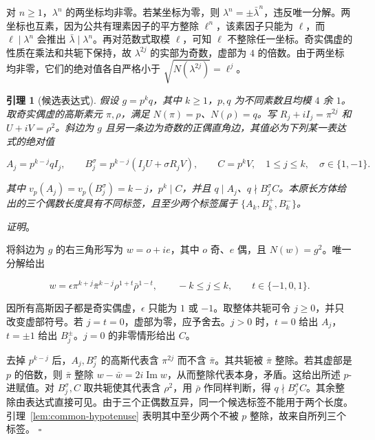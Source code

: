 \documentclass[11pt,a4paper,twoside]{article}
\numberwithin{equation}{section}
\newcommand{\proseheadingstop}{。}
\newtheorem{lemma}[theorem]{引理}
\providecommand{\proofname}{证明}
\newenvironment{proof}[1][\proofname]{%
  \par\addvspace{.65\baselineskip}\noindent
  \textit{#1}\proseheadingstop\enspace\ignorespaces
}{%
  \unskip\nobreak\hfill\nobreak\(\square\)\par
  \addvspace{.65\baselineskip}
}
\begin{document}
对 \(n\ge1\)，\(\lambda^n\) 的两坐标均非零。若某坐标为零，则 \(\lambda^n=\pm\bar\lambda^n\)，违反唯一分解。两坐标也互素，因为公共有理素因子的平方整除 \(\ell^n\)，该素因子只能为 \(\ell\)，而 \(\ell\mid\lambda^n\) 会推出 \(\bar\lambda\mid\lambda^n\)。再对范数式取模 \(\ell\)，可知 \(\ell\) 不整除任一坐标。奇实偶虚的性质在乘法和共轭下保持，故 \(\lambda^{2j}\) 的实部为奇数，虚部为 \(4\) 的倍数。由于两坐标均非零，它们的绝对值各自严格小于 \(\sqrt{N(\lambda^{2j})}=\ell^j\)。

\begin{lemma}[候选表达式]\label{lem:candidates}
假设 \(g=p^kq\)，其中 \(k\ge1\)，\(p,q\) 为不同素数且均模 \(4\) 余 \(1\)。取奇实偶虚的高斯素元 \(\pi,\rho\)，满足 \(N(\pi)=p\)、\(N(\rho)=q\)。写 \(R_j+iI_j=\pi^{2j}\) 和 \(U+iV=\rho^2\)。斜边为 \(g\) 且另一条边为奇数的正偶直角边，其值必为下列某一表达式的绝对值

\[
A_j=p^{k-j}qI_j,\qquad B_j^\sigma=p^{k-j}(I_jU+\sigma R_jV),\qquad C=p^kV,
\quad 1\le j\le k,\quad \sigma\in\{1,-1\}.
\]

其中 \(v_p(A_j)=v_p(B_j^\sigma)=k-j\)，\(p^k\mid C\)，并且 \(q\mid A_j\)、\(q\nmid B_j^\sigma C\)。本原长方体给出的三个偶数长度具有不同标签，且至少两个标签属于 \(\{A_k,B_k^+,B_k^-\}\)。

\end{lemma}

\begin{proof}
将斜边为 \(g\) 的右三角形写为 \(w=o+ie\)，其中 \(o\) 奇、\(e\) 偶，且 \(N(w)=g^2\)。唯一分解给出

\[
w=\epsilon\pi^{k+j}\bar\pi^{k-j}\rho^{1+t}\bar\rho^{1-t},
\qquad -k\le j\le k,\qquad t\in\{-1,0,1\}.
\]

因所有高斯因子都是奇实偶虚，\(\epsilon\) 只能为 \(1\) 或 \(-1\)。取整体共轭可令 \(j\ge0\)，并只改变虚部符号。若 \(j=t=0\)，虚部为零，应予舍去。\(j>0\) 时，\(t=0\) 给出 \(A_j\)，\(t=\pm1\) 给出 \(B_j^\pm\)。\(j=0\) 的非零情形给出 \(C\)。

去掉 \(p^{k-j}\) 后，\(A_j,B_j^\sigma\) 的高斯代表含 \(\pi^{2j}\) 而不含 \(\bar\pi\)。其共轭被 \(\bar\pi\) 整除。若其虚部是 \(p\) 的倍数，则 \(\bar\pi\) 整除 \(w-\bar w=2i\operatorname{Im}w\)，从而整除代表本身，矛盾。这给出所述 \(p\)-进赋值。对 \(B_j^\sigma,C\) 取共轭使其代表含 \(\rho^2\)，用 \(\bar\rho\) 作同样判断，得 \(q\nmid B_j^\sigma C\)。其余整除由表达式直接可见。由于三个正偶数互异，同一个候选标签不能用于两个长度。引理~\ref{lem:common-hypotenuse} 表明其中至少两个不被 \(p\) 整除，故来自所列三个标签。
\end{proof}
\end{document}
